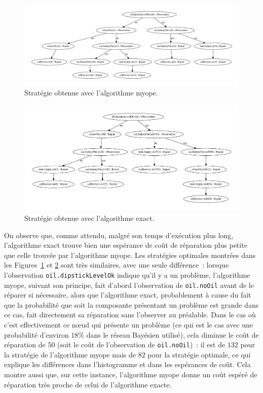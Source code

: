 \documentclass[a4paper,11pt]{article}
\theoremstyle{plain}
\theoremstyle{definition}
\begin{document}
\begin{figure}[ht]
\centering
\includegraphics[width=\textwidth]{Figures/myopic.pdf}
\caption{Stratégie obtenue avec l'algorithme myope.}
\label{FigArbreMyope}
\end{figure}

\begin{figure}[ht]
\centering
\includegraphics[width=\textwidth]{Figures/exact.pdf}
\caption{Stratégie obtenue avec l'algorithme exact.}
\label{FigArbreExact}
\end{figure}

On observe que, comme attendu, malgré son temps d'exécution plus long, l'algorithme exact trouve bien une espérance de coût de réparation plus petite que celle trouvée par l'algorithme myope. Les stratégies optimales montrées dans les Figures~\ref{FigArbreMyope} et \ref{FigArbreExact} sont très similaires, avec une seule différence~: lorsque l'observation \texttt{oil.dipstickLevelOk} indique qu'il y a un problème, l'algorithme myope, suivant son principe, fait d'abord l'observation de \texttt{oil.noOil} avant de le réparer si nécessaire, alors que l'algorithme exact, probablement à cause du fait que la probabilité que  soit la composante présentant un problème est grande dans ce cas, fait directement sa réparation sans l'observer au préalable. Dans le cas où c'est effectivement ce nœud qui présente un problème (ce qui est le cas avec une probabilité d'environ $18\%$ dans le réseau Bayésien utilisé), cela diminue le coût de réparation de $50$ (soit le coût de l'observation de \texttt{oil.noOil})~: il est de $132$ pour la stratégie de l'algorithme myope mais de $82$ pour la stratégie optimale, ce qui explique les différences dans l'histogramme et dans les espérances de coût. Cela montre aussi que, sur cette instance, l'algorithme myope donne un coût espéré de réparation très proche de celui de l'algorithme exacte.
\end{document}
